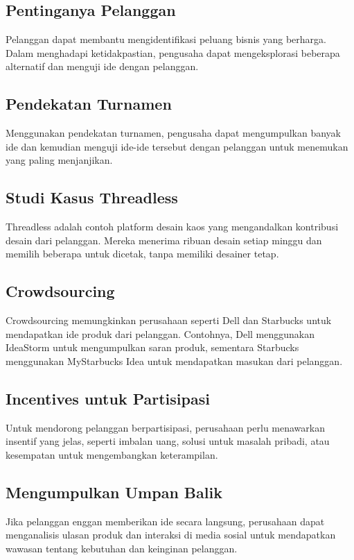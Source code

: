 \documentclass{article}
\begin{document}
\subsection{Pentinganya Pelanggan}
Pelanggan dapat membantu mengidentifikasi peluang bisnis yang berharga. Dalam menghadapi ketidakpastian, pengusaha dapat mengeksplorasi beberapa alternatif dan menguji ide dengan pelanggan.

\subsection{Pendekatan Turnamen}
Menggunakan pendekatan turnamen, pengusaha dapat mengumpulkan banyak ide dan kemudian menguji ide-ide tersebut dengan pelanggan untuk menemukan yang paling menjanjikan.

\subsection{Studi Kasus Threadless}
Threadless adalah contoh platform desain kaos yang mengandalkan kontribusi desain dari pelanggan. Mereka menerima ribuan desain setiap minggu dan memilih beberapa untuk dicetak, tanpa memiliki desainer tetap.

\subsection{Crowdsourcing}
Crowdsourcing memungkinkan perusahaan seperti Dell dan Starbucks untuk mendapatkan ide produk dari pelanggan. Contohnya, Dell menggunakan IdeaStorm untuk mengumpulkan saran produk, sementara Starbucks menggunakan MyStarbucks Idea untuk mendapatkan masukan dari pelanggan.

\subsection{Incentives untuk Partisipasi}
Untuk mendorong pelanggan berpartisipasi, perusahaan perlu menawarkan insentif yang jelas, seperti imbalan uang, solusi untuk masalah pribadi, atau kesempatan untuk mengembangkan keterampilan.

\subsection{Mengumpulkan Umpan Balik}
Jika pelanggan enggan memberikan ide secara langsung, perusahaan dapat menganalisis ulasan produk dan interaksi di media sosial untuk mendapatkan wawasan tentang kebutuhan dan keinginan pelanggan.
\end{document}
